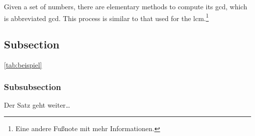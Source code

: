 Given a set of numbers, there are elementary methods to compute 
its \acrlong{gcd}, which is abbreviated \acrshort{gcd}. This 
process is similar to that used for the \acrfull{lcm}.\footnote{Eine andere Fußnote mit mehr Informationen.}

    \subsection{Subsection}
    \lipsum[1]
    \ref{tab:beispiel}
    
        \subsubsection{Subsubsection}
        \lipsum[1] Der Satz geht weiter\dots